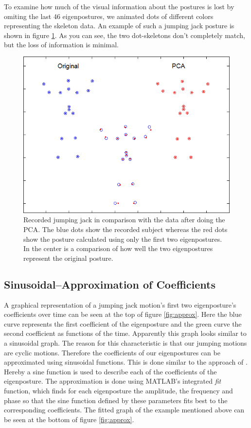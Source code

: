 \documentclass[a4paper]{article}
\begin{document}
To examine how much of the visual information about the postures is lost by omiting the last 46 eigenpostures, we animated dots of different colors representing the skeleton data.
An example of such a jumping jack posture is shown in figure \ref{fig:orig_pca_1}.
As you can see, the two dot-skeletons don't completely match, but the loss of information is minimal.

\begin{figure}
		\centering
		\includegraphics[height=0.3\textheight]{comparison_Original_PCA.png}
		\caption{Recorded jumping jack in comparison with the data after doing the PCA.
		The blue dots show the recorded subject whereas the red dots show the posture calculated using only the first two eigenpostures.
		In the center is a comparison of how well the two eigenpostures represent the original posture.
		}
		\label{fig:orig_pca_1}
\end{figure}

\subsection{Sinusoidal--Approximation of Coefficients}\label{sinusoidalApprox}
A graphical representation of a jumping jack motion's first two eigenposture's coefficients over time can be seen at the top of figure \ref{fig:approx}.
Here the blue curve represents the first coefficient of the eigenposture and the green curve the second coefficient as functions of the time.
Apparently this graph looks similar to a sinusoidal graph.
The reason for this characteristic is that our jumping motions are cyclic motions.
Therefore the coefficients of our eigenpostures can be approximated using sinusoidal functions.
This is done similar to the approach of \cite{origin}.
Hereby a sine function is used to describe each of the coefficients of the eigenposture.
The approximation is done using MATLAB's integrated \emph{fit} function, which finds for each eigenposture the amplitude, the frequency and phase so that the sine function defined by these parameters fits best to the corresponding coefficients.
The fitted graph of the example mentioned above can be seen at the bottom of figure \ref{fig:approx}.
\end{document}
